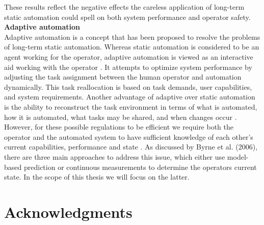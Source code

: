 These results reflect the negative effects the careless application of long-term static automation could spell on both system performance and operator safety.\\[10pt]
\textbf{Adaptive automation}\\[10pt]
Adaptive automation is a concept that has been proposed to resolve the problems of long-term static automation. Whereas static automation is considered to be an agent working for the operator, adaptive automation is viewed as an interactive aid working with the operator \cite{Byrne2006}. It attempts to optimize system performance by adjusting the task assignment between the human operator and automation dynamically. This task reallocation is based on task demands, user capabilities, and system requirements. Another advantage of adaptive over static automation is the ability to reconstruct the task environment in terms of what is automated, how it is automated, what tasks may be shared, and when changes occur \cite{Byrne2006}. However, for these possible regulations to be efficient we require both the operator and the automated system to have sufficient knowledge of each other's current capabilities, performance and state \cite{Byrne2006}.
As discussed by Byrne et al. (2006), there are three main approaches to address this issue, which either use model-based prediction or continuous measurements to determine the operators current state. In the scope of this thesis we will focus on the latter.

\section{Acknowledgments}

